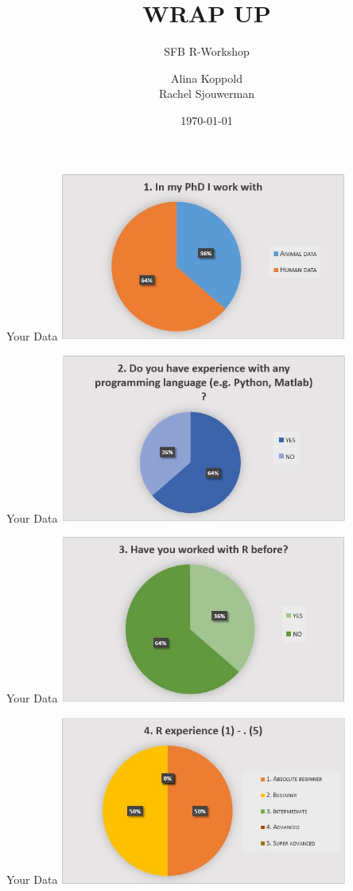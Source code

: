 \documentclass{beamer}
\title{WRAP UP}
\subtitle{SFB R-Workshop}
\author{Alina Koppold \\ Rachel Sjouwerman}
\date{\tiny{\today}}
\institute{\url{a.koppold@uke.de}\\ \url{r.sjouwerman@uke.de}}
\begin{document}
\begin{frame}[plain,t]
\titlepage
\end{frame}

\begin{frame}{Your Data}
    \includegraphics[width = 9.5cm]{um1.JPG}
\end{frame}

\begin{frame}{Your Data}
    \includegraphics[width = 9.5cm]{um2.JPG}
\end{frame}

\begin{frame}{Your Data}
    \includegraphics[width = 9.5cm]{um3.JPG}
\end{frame}

\begin{frame}{Your Data}
    \includegraphics[width = 9.5cm]{um4.JPG}
\end{frame}
\end{document}
